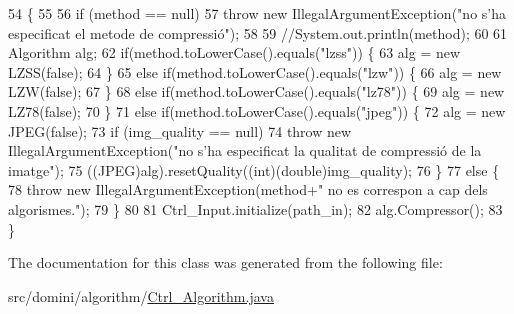 \begin{DoxyCode}
54                                                                           \{
55         
56         \textcolor{keywordflow}{if} (method == null)
57             \textcolor{keywordflow}{throw} \textcolor{keyword}{new} IllegalArgumentException(\textcolor{stringliteral}{"no s'ha especificat el metode de compressió"});
58 
59         \textcolor{comment}{//System.out.println(method);}
60 
61         Algorithm alg;
62         \textcolor{keywordflow}{if}(method.toLowerCase().equals(\textcolor{stringliteral}{"lzss"})) \{
63             alg = \textcolor{keyword}{new} LZSS(\textcolor{keyword}{false});
64         \}
65         \textcolor{keywordflow}{else} \textcolor{keywordflow}{if}(method.toLowerCase().equals(\textcolor{stringliteral}{"lzw"})) \{
66             alg = \textcolor{keyword}{new} LZW(\textcolor{keyword}{false});
67         \}
68         \textcolor{keywordflow}{else} \textcolor{keywordflow}{if}(method.toLowerCase().equals(\textcolor{stringliteral}{"lz78"})) \{
69             alg = \textcolor{keyword}{new} LZ78(\textcolor{keyword}{false});
70         \}
71         \textcolor{keywordflow}{else} \textcolor{keywordflow}{if}(method.toLowerCase().equals(\textcolor{stringliteral}{"jpeg"})) \{
72             alg = \textcolor{keyword}{new} JPEG(\textcolor{keyword}{false});
73             \textcolor{keywordflow}{if} (img\_quality == null) 
74                 \textcolor{keywordflow}{throw} \textcolor{keyword}{new} IllegalArgumentException(\textcolor{stringliteral}{"no s'ha especificat la qualitat de compressió de la
       imatge"});
75             ((JPEG)alg).resetQuality((\textcolor{keywordtype}{int})(\textcolor{keywordtype}{double})img\_quality);
76         \}
77         \textcolor{keywordflow}{else} \{
78             \textcolor{keywordflow}{throw} \textcolor{keyword}{new} IllegalArgumentException(method+\textcolor{stringliteral}{" no es correspon a cap dels algorismes."});
79         \}
80         
81         Ctrl\_Input.initialize(path\_in);
82         alg.Compressor();
83     \}
\end{DoxyCode}


The documentation for this class was generated from the following file\+:\begin{DoxyCompactItemize}
\item 
src/domini/algorithm/\hyperlink{Ctrl__Algorithm_8java}{Ctrl\+\_\+\+Algorithm.\+java}\end{DoxyCompactItemize}
